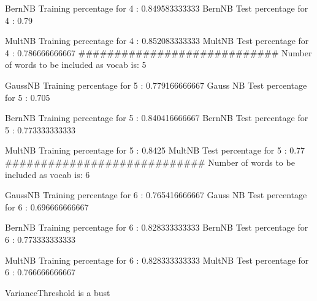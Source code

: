 BernNB Training percentage for 4 : 0.849583333333
BernNB Test percentage for 4 :     0.79

MultNB Training percentage for 4 : 0.852083333333
MultNB Test percentage for 4 :     0.786666666667
############################
Number of words to be included as vocab is: 5

GaussNB Training percentage for 5 : 0.779166666667
Gauss NB Test percentage for 5 :     0.705

BernNB Training percentage for 5 : 0.840416666667
BernNB Test percentage for 5 :     0.773333333333

MultNB Training percentage for 5 : 0.8425
MultNB Test percentage for 5 :     0.77
############################
Number of words to be included as vocab is: 6

GaussNB Training percentage for 6 : 0.765416666667
Gauss NB Test percentage for 6 :     0.696666666667

BernNB Training percentage for 6 : 0.828333333333
BernNB Test percentage for 6 :     0.773333333333

MultNB Training percentage for 6 : 0.828333333333
MultNB Test percentage for 6 :     0.766666666667

VarianceThreshold is a bust